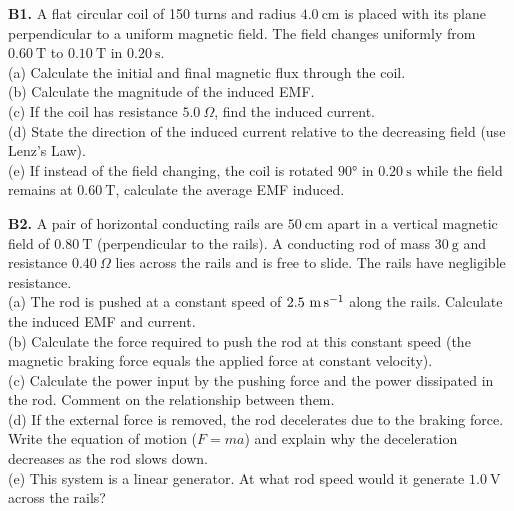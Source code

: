 \begin{exercisebox}[26]
\textbf{B1.} A flat circular coil of 150 turns
and radius $4.0\ \text{cm}$ is placed with its
plane perpendicular to a uniform magnetic field.
The field changes uniformly from $0.60\ \text{T}$
to $0.10\ \text{T}$ in $0.20\ \text{s}$.\\[4pt]
(a) Calculate the initial and final magnetic flux
through the coil.\\
(b) Calculate the magnitude of the induced EMF.\\
(c) If the coil has resistance $5.0\ \Omega$, find
the induced current.\\
(d) State the direction of the induced current
relative to the decreasing field (use Lenz's Law).\\
(e) If instead of the field changing, the coil is
rotated $90°$ in $0.20\ \text{s}$ while the field
remains at $0.60\ \text{T}$, calculate the average
EMF induced.
\hfill{}

\vspace{0.4cm}

\textbf{B2.} A pair of horizontal conducting rails
are $50\ \text{cm}$ apart in a vertical magnetic
field of $0.80\ \text{T}$ (perpendicular to the
rails). A conducting rod of mass $30\ \text{g}$ and
resistance $0.40\ \Omega$ lies across the rails and
is free to slide. The rails have negligible resistance.\\[4pt]
(a) The rod is pushed at a constant speed of
$2.5\ \text{m\,s}^{-1}$ along the rails.
Calculate the induced EMF and current.\\
(b) Calculate the force required to push the rod
at this constant speed (the magnetic braking force
equals the applied force at constant velocity).\\
(c) Calculate the power input by the pushing force
and the power dissipated in the rod. Comment on
the relationship between them.\\
(d) If the external force is removed, the rod
decelerates due to the braking force. Write the
equation of motion ($F = ma$) and explain why the
deceleration decreases as the rod slows down.\\
(e) This system is a linear generator. At what
rod speed would it generate $1.0\ \text{V}$ across
the rails?
\hfill{}

\vspace{0.4cm}


\end{exercisebox}

